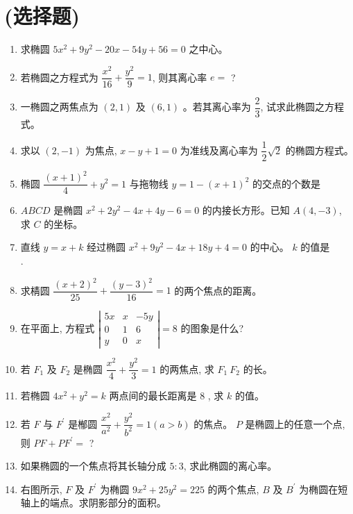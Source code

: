 \documentclass[10pt]{article}
\begin{document}
\section*{(选择题)}
\begin{enumerate}
  \item 求椭圆 $5 x^{2}+9 y^{2}-20 x-54 y+56=0$ 之中心。
  \item 若椭圆之方程式为 $\dfrac{x^{2}}{16}+\dfrac{y^{2}}{9}=1$, 则其离心率 $e=$ ?
  \item 一椭圆之两焦点为 $(2,1)$ 及 $(6,1)$ 。若其离心率为 $\dfrac{2}{3}$, 试求此椭圆之方程式。
  \item 求以 $(2,-1)$ 为焦点, $x-y+1=0$ 为准线及离心率为 $\dfrac{1}{2} \sqrt{2}$ 的椭圆方程式。
  \item 椭圆 $\dfrac{(x+1)^{2}}{4}+y^{2}=1$ 与拖物线 $y=1-(x+1)^{2}$ 的交点的个数是 $\qquad$
  \item $ABCD$ 是椭圆 $x^{2}+2 y^{2}-4 x+4 y-6=0$ 的内接长方形。已知 $A(4,-3)$, 求 $C$ 的坐标。
  \item 直线 $y=x+k$ 经过椭圆 $x^{2}+9 y^{2}-4 x+18 y+4=0$ 的中心。 $k$ 的值是 $\qquad$ .
  \item 求棈圆 $\dfrac{(x+2)^{2}}{25}+\dfrac{(y-3)^{2}}{16}=1$ 的两个焦点的距离。
  \item 在平面上, 方程式 $\left|\begin{array}{ccc}5 x & x & -5 y \\ 0 & 1 & 6 \\ y & 0 & x\end{array}\right|=8$ 的图象是什么?
  \item 若 $F_{1}$ 及 $F_{2}$ 是椭圆 $\dfrac{x^{2}}{4}+\dfrac{y^{2}}{3}=1$ 的两焦点, 求 $F_{1} ~F_{2}$ 的长。
  \item 若椭圆 $4 x^{2}+y^{2}=k$ 两点间的最长距离是 8 , 求 $k$ 的值。
  \item 若 $F$ 与 $F^{\prime}$ 是㮋圆 $\dfrac{x^{2}}{a^{2}}+\dfrac{y^{2}}{b^{2}}=1(a>b)$ 的焦点。 $P$ 是椭圆上的任意一个点, 则 $PF+PF^{\prime}=$ ?
  \item 如果椭圆的一个焦点将其长轴分成 $5: 3$, 求此椭圆的离心率。
  \item 右图所示, $F$ 及 $F^{\prime}$ 为椭圆 $9 x^{2}+25 y^{2}=225$ 的两个焦点, $B$ 及 $B^{\prime}$ 为椭圆在短轴上的端点。求阴影部分的面积。


\end{enumerate}
\end{document}
